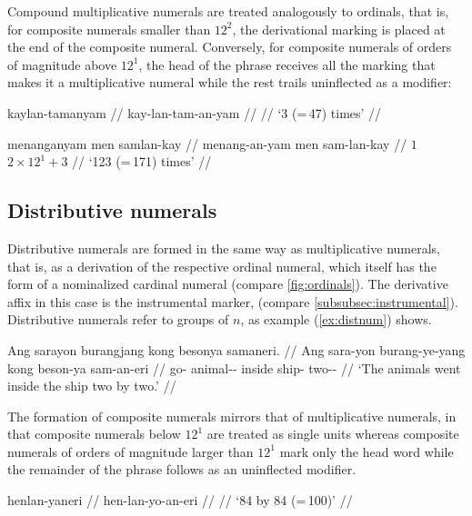 \xe

Compound multiplicative numerals are treated analogously to ordinals, that is, 
for composite numerals smaller than $12^2$, the derivational marking is placed 
at the end of the composite numeral. Conversely, for composite numerals 
of orders of magnitude above $12^1$, the head of the phrase receives all 
the marking that makes it a multiplicative numeral while the rest trails 
uninflected as a modifier:

\pex
\a\begingl
	\gla kaylan-tamanyam //
	\glb kay-lan-tam-an-yam //
	 //
	\glft `3\elv{} (=\,47) times' //
\endgl

\a\begingl
	\gla menanganyam men samlan-kay //
	\glb menang-an-yam men sam-lan-kay //
	 {$1$} {$2 \times 12^1 + 3$} //
	\glft `123 (=\,171) times' //
\endgl

\xe


\subsection{Distributive numerals}

Distributive numerals are formed in the same way as multiplicative numerals, 
that is, as a derivation of the respective ordinal numeral, which itself has 
the form of a nominalized cardinal numeral (compare \autoref{fig:ordinals}). 
The derivative affix in this case is the instrumental marker,  
(compare \autoref{subsubsec:instrumental}). Distributive numerals refer to 
groups of $n$, as example (\ref{ex:distnum}) shows.

\ex\label{ex:distnum}
\begingl
	\gla Ang sarayon burangjang kong besonya samaneri. //
	\glb Ang sara-yon burang-ye-yang kong beson-ya sam-an-eri //
	\glc \AgtT{} go-\TplN{} animal-\Pl{}-\Aarg{} inside ship-\Loc{} 
		two-\Nmlz{}-\Ins{} //
	\glft `The animals went inside the ship two by two.' //
\endgl
\xe

The formation of composite numerals mirrors that of multiplicative numerals, in
that composite numerals below $12^1$ are treated as single units whereas
composite numerals of orders of magnitude larger than $12^1$ mark only the head
word while the remainder of the phrase follows as an uninflected modifier.

\pex
\a\begingl
	\gla henlan-yaneri //
	\glb hen-lan-yo-an-eri //
	 //
	\glft `84 by 84 (=\,100)' //
\endgl

